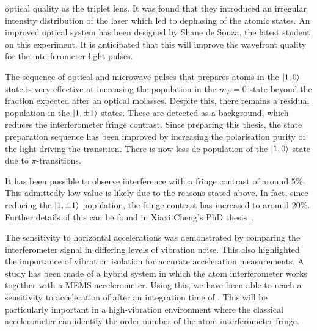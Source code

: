 optical quality as the triplet lens. It was found that they introduced
an irregular intensity distribution of the laser which led to
dephasing of the atomic states. An improved optical system has been
designed by Shane de Souza, the latest student on this experiment. It
is anticipated that this will improve the wavefront quality for the
interferometer light pulses.
\par\noindent
The sequence of optical and microwave pulses that prepares
atoms in the $\ket{1,0}$ state is very effective at increasing
the population in the $m_F = 0$ state beyond the fraction expected
after an optical molasses. Despite this, there remains a residual
population in the $\ket{1,\pm 1}$ states. These are detected as a
background, which reduces the interferometer fringe contrast. Since
preparing this thesis, the state preparation sequence has been
improved by increasing the polarisation purity of the light driving
the  transition. There is now less de-population of the
$\ket{1,0}$ state due to $\pi$-transitions. 
\par\noindent
It has been possible to observe interference with a fringe contrast of
around 5\%. This admittedly low value is likely due to the reasons
stated above. In fact, since reducing the $\ket{1,\pm 1}$ population,
the fringe contrast has increased to around 20\%. Further details of
this can be found in Xiaxi Cheng's PhD thesis~\cite{Cheng2018}.
\par\noindent
The sensitivity to horizontal accelerations was demonstrated by
comparing the interferometer signal in differing levels of vibration
noise. This also highlighted the importance of vibration isolation for
accurate acceleration measurements. A study has been made of a hybrid
system in which the atom interferometer works together with a MEMS
accelerometer. Using this, we have been able to reach a sensitivity to
acceleration of  after an integration time
of . This will be particularly important in a high-vibration
environment where the classical accelerometer can identify the order
number of the atom interferometer fringe. 
